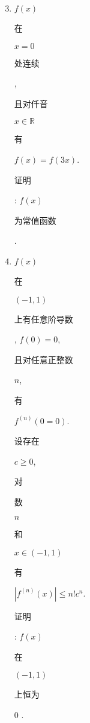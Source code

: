 \documentclass[10pt]{article}
\begin{document}
\begin{enumerate}
  \setcounter{enumi}{2}
  \item $f(x)$ \begin{CJK}{UTF8}{mj}在\end{CJK} $x=0$ \begin{CJK}{UTF8}{mj}处连续\end{CJK}, \begin{CJK}{UTF8}{mj}且对仟音\end{CJK} $x \in \mathbb{R}$ \begin{CJK}{UTF8}{mj}有\end{CJK} $f(x)=f(3 x)$. \begin{CJK}{UTF8}{mj}证明\end{CJK}: $f(x)$ \begin{CJK}{UTF8}{mj}为常值函数\end{CJK}.

  \item $f(x)$ \begin{CJK}{UTF8}{mj}在\end{CJK} $(-1,1)$ \begin{CJK}{UTF8}{mj}上有任意阶导数\end{CJK}, $f(0)=0$, \begin{CJK}{UTF8}{mj}且对任意正整数\end{CJK} $n$, \begin{CJK}{UTF8}{mj}有\end{CJK} $f^{(n)}(0=0)$. \begin{CJK}{UTF8}{mj}设存在\end{CJK} $c \geq 0$, \begin{CJK}{UTF8}{mj}对\end{CJK} \begin{CJK}{UTF8}{mj}数\end{CJK} $n$ \begin{CJK}{UTF8}{mj}和\end{CJK} $x \in(-1,1)$ \begin{CJK}{UTF8}{mj}有\end{CJK} $\left|f^{(n)}(x)\right| \leq n ! c^{n}$. \begin{CJK}{UTF8}{mj}证明\end{CJK}: $f(x)$ \begin{CJK}{UTF8}{mj}在\end{CJK} $(-1,1)$ \begin{CJK}{UTF8}{mj}上恒为\end{CJK} 0 .


\end{enumerate}
\end{document}
